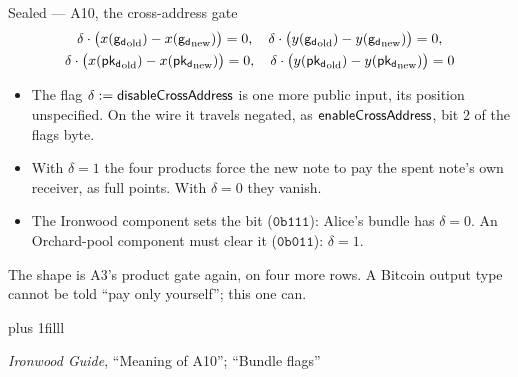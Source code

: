 \documentclass[aspectratio=169,11pt]{beamer}
\newcommand{\gd}{\ensuremath{\mathsf{g_d}}}
\newcommand{\pkd}{\ensuremath{\mathsf{pk_d}}}
\newcommand{\src}[1]{\par\vskip0pt plus 1filll
  {\fontsize{6}{7.2}\selectfont\color{arbdim}\raggedright #1\par}}
\begin{document}
\begin{frame}{Sealed --- A10, the cross-address gate}
\begin{gather*}
\delta \cdot \bigl(x(\Eold{\gd}) - x(\Enew{\gd})\bigr) = 0,\quad
\delta \cdot \bigl(y(\Eold{\gd}) - y(\Enew{\gd})\bigr) = 0, \\
\delta \cdot \bigl(x(\Eold{\pkd}) - x(\Enew{\pkd})\bigr) = 0,\quad
\delta \cdot \bigl(y(\Eold{\pkd}) - y(\Enew{\pkd})\bigr) = 0
\end{gather*}
\begin{itemize}
  \item The flag $\delta := \mathsf{disableCrossAddress}$ is one more
    public input, its position unspecified. On the wire it travels
    negated, as $\mathsf{enableCrossAddress}$, bit $2$ of the flags
    byte.
  \item With $\delta = 1$ the four products force the new note to pay
    the spent note's own receiver, as full points. With $\delta = 0$
    they vanish.
  \item The Ironwood component sets the bit ($\mathtt{0b111}$): Alice's
    bundle has $\delta = 0$. An Orchard-pool component must clear it
    ($\mathtt{0b011}$): $\delta = 1$.
\end{itemize}
\medskip
\small The shape is A3's product gate again, on four more rows. A
Bitcoin output type cannot be told ``pay only yourself''; this one can.
\src{\emph{Ironwood Guide}, ``Meaning of A10'';
``Bundle flags''}
\end{frame}
\end{document}
